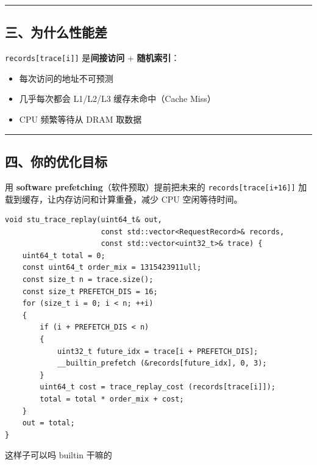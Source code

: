 \documentclass[11pt, a4paper]{article}
\begin{document}
\begin{aibox}
\begin{center}\rule{\textwidth}{0.4pt}\end{center}

\subsection*{三、为什么性能差}

\texttt{records[trace[i]]} 是\textbf{间接访问} + \textbf{随机索引}：
\begin{itemize}
    \item 每次访问的地址不可预测
    \item 几乎每次都会 L1/L2/L3 缓存未命中（Cache Miss）
    \item CPU 频繁等待从 DRAM 取数据
\end{itemize}

\begin{center}\rule{\textwidth}{0.4pt}\end{center}

\subsection*{四、你的优化目标}

用 \textbf{software prefetching}（软件预取）提前把未来的 \texttt{records[trace[i+16]]} 加载到缓存，让内存访问和计算重叠，减少 CPU 空闲等待时间。
\end{aibox}

\vspace{1.5em}

\begin{userbox}
\begin{verbatim}
void stu_trace_replay(uint64_t& out,
                      const std::vector<RequestRecord>& records,
                      const std::vector<uint32_t>& trace) {
    uint64_t total = 0;
    const uint64_t order_mix = 1315423911ull;
    const size_t n = trace.size();
    const size_t PREFETCH_DIS = 16;
    for (size_t i = 0; i < n; ++i)
    {
        if (i + PREFETCH_DIS < n)
        {
            uint32_t future_idx = trace[i + PREFETCH_DIS];
            __builtin_prefetch (&records[future_idx], 0, 3);
        }
        uint64_t cost = trace_replay_cost (records[trace[i]]);
        total = total * order_mix + cost;
    }
    out = total;
}
\end{verbatim}

这样子可以吗 builtin 干嘛的
\end{userbox}
\end{document}
